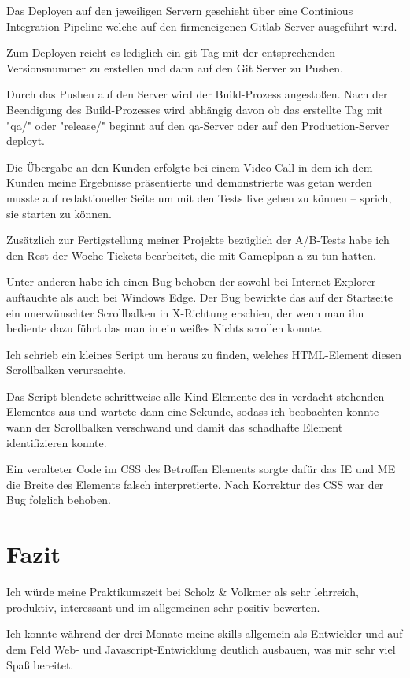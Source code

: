 \documentclass[11pt]{article} %
\begin{document}
Das Deployen auf den jeweiligen Servern geschieht über eine Continious Integration Pipeline welche auf den firmeneigenen Gitlab-Server ausgeführt wird.

Zum Deployen reicht es lediglich ein git Tag mit der entsprechenden Versionsnummer zu erstellen und dann auf den Git Server zu Pushen.

Durch das Pushen auf den Server wird der Build-Prozess angestoßen. Nach der Beendigung des Build-Prozesses wird abhängig davon ob das erstellte Tag mit "qa/" oder "release/" beginnt auf den qa-Server oder auf den Production-Server deployt.

Die Übergabe an den Kunden erfolgte bei einem Video-Call in dem ich dem Kunden meine Ergebnisse präsentierte und demonstrierte was getan werden musste auf redaktioneller Seite um mit den Tests live gehen zu können – sprich, sie starten zu können.

Zusätzlich zur Fertigstellung meiner Projekte bezüglich der A/B-Tests habe ich den Rest der Woche Tickets bearbeitet, die mit Gameplpan a zu tun hatten.

Unter anderen habe ich einen Bug behoben der sowohl bei Internet Explorer auftauchte als auch bei Windows Edge. Der Bug bewirkte das auf der Startseite ein unerwünschter Scrollbalken in X-Richtung erschien, der wenn man ihn bediente dazu führt das man in ein weißes Nichts scrollen konnte.

Ich schrieb ein kleines Script um heraus zu finden, welches HTML-Element diesen Scrollbalken verursachte.

Das Script blendete schrittweise alle Kind Elemente des in verdacht stehenden Elementes aus und wartete dann eine Sekunde, sodass ich beobachten konnte wann der Scrollbalken verschwand und damit das schadhafte Element identifizieren konnte.

Ein veralteter Code im CSS des Betroffen Elements sorgte dafür das IE und ME die Breite des Elements falsch interpretierte. Nach Korrektur des CSS war der Bug folglich behoben.

\newpage
\section{Fazit} \label{sec:faz}

Ich würde meine Praktikumszeit bei Scholz \& Volkmer als sehr lehrreich, produktiv, interessant und im allgemeinen sehr positiv bewerten.

Ich konnte während der drei Monate meine skills allgemein als  Entwickler und auf dem Feld Web- und Javascript-Entwicklung deutlich ausbauen, was mir sehr viel Spaß bereitet.
\end{document}
